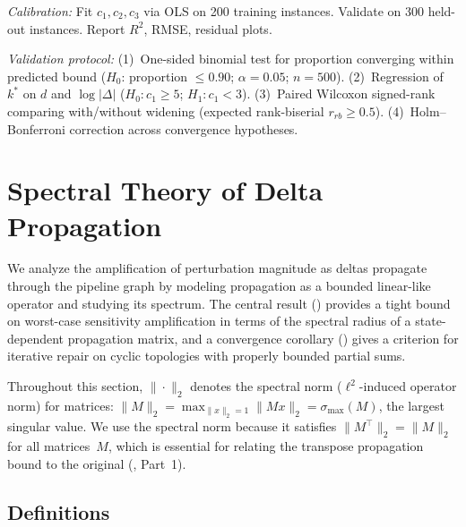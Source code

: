 \documentclass[11pt,a4paper]{article}
\theoremstyle{definition}
\newcommand{\specnorm}[1]{\|#1\|_2}
\begin{document}
\emph{Calibration:} Fit $c_1, c_2, c_3$ via OLS on 200 training instances.
Validate on 300 held-out instances.  Report $R^2$, RMSE, residual plots.

\emph{Validation protocol:}
(1)~One-sided binomial test for proportion converging within predicted bound
($H_0$: proportion $\leq 0.90$; $\alpha = 0.05$; $n = 500$).
(2)~Regression of $k^*$ on $d$ and $\log|\Delta|$
($H_0: c_1 \geq 5$; $H_1: c_1 < 3$).
(3)~Paired Wilcoxon signed-rank comparing with/without widening
(expected rank-biserial $r_{rb} \geq 0.5$).
(4)~Holm--Bonferroni correction across convergence hypotheses.





\section{Spectral Theory of Delta Propagation}
\label{sec:spectral}

We analyze the amplification of perturbation magnitude as deltas propagate
through the pipeline graph by modeling propagation as a bounded linear-like
operator and studying its spectrum.  The central result ()
provides a tight bound on worst-case sensitivity amplification in terms of the
spectral radius of a state-dependent propagation matrix, and a convergence
corollary () gives a criterion for iterative repair
on cyclic topologies with properly bounded partial sums.

Throughout this section, $\specnorm{\cdot}$ denotes the spectral norm
($\ell^2$-induced operator norm) for matrices: $\specnorm{M} = \max_{\|x\|_2=1}
\|Mx\|_2 = \sigma_{\max}(M)$, the largest singular value.  We use the spectral
norm because it satisfies $\specnorm{M^\top} = \specnorm{M}$ for all matrices~$M$,
which is essential for relating the transpose propagation bound to the original
(, Part~1).

\subsection{Definitions}
\end{document}
